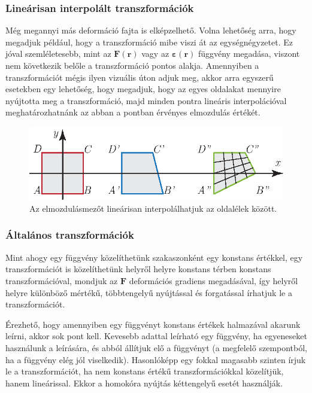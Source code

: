 \documentclass[12pt,a4paper]{scrartcl}
\let\mathbf\bm
\begin{document}
\subsubsection{Lineárisan interpolált transzformációk}
Még megannyi más deformáció fajta is elképzelhető. Volna lehetőség arra, hogy megadjuk például, hogy a transzformáció mibe viszi át az egységnégyzetet. Ez jóval szemléletesebb, mint az ${\mathbf{F}}\left( {\mathbf{r}} \right)$ vagy az ${\mathbf{\varepsilon }}\left( {\mathbf{r}} \right)$ függvény megadása, viszont nem következik belőle a transzformáció pontos alakja. Amennyiben a transzformációt mégis ilyen vizuális úton adjuk meg, akkor arra egyszerű esetekben egy lehetőség, hogy megadjuk, hogy az egyes oldalakat mennyire nyújtotta meg a transzformáció, majd minden pontra lineáris interpolációval meghatározhatnánk az abban a pontban érvényes elmozdulás értékét.

\begin{figure}[htb] 
\centering    
\includegraphics[scale=1]{figs/linearisan_interpolalt.eps}
\caption{Az elmozdulásmezőt lineárisan interpolálhatjuk az oldalélek között.}
\label{fig:linearis_interpolacios_traf}
\end{figure}

\subsubsection{Általános transzformációk}
Mint ahogy egy függvény közelíthetünk szakaszonként egy konstans értékkel, egy transzformációt is közelíthetünk helyről helyre konstans térben konstans transzformációval, mondjuk az ${\mathbf{F}}$ deformációs gradiens megadásával, így helyről helyre különböző mértékű, többtengelyű nyújtással és forgatással írhatjuk le a transzformációt.

Érezhető, hogy amennyiben egy függvényt konstans értékek halmazával akarunk leírni, akkor sok pont kell. Kevesebb adattal leírható egy függvény, ha egyeneseket használunk a leírására, és abból állítjuk elő a függvényt (a megfelelő szempontból, ha a függvény elég jól viselkedik). Hasonlóképp egy fokkal magasabb szinten írjuk le a transzformációt, ha nem konstans értékű transzformációkkal közelítjük, hanem lineárissal. Ekkor a homokóra nyújtás kéttengelyű esetét használják. 
\end{document}
